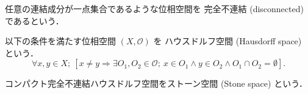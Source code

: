 \documentclass[titlepage]{ltjsreport}
\begin{document}
\begin{definition}[完全不連結]
  任意の連結成分が一点集合であるような位相空間を
  完全不連結 (disconnected) であるという．
\end{definition}

\begin{definition}[ハウスドルフ空間]
  以下の条件を満たす位相空間 $(X,\mathcal{O})$ を
  ハウスドルフ空間 (Hausdorff space) という．
  \begin{equation}
    \forall x,y\in X;
    \ \left[x\neq y\Longrightarrow\exists O_1,O_2\in\mathcal{O};
      \ x\in O_1\wedge y\in O_2\wedge O_1\cap O_2=\emptyset\right].
  \end{equation}
\end{definition}

\begin{definition}[ストーン空間]\label{def:stone-space}
  コンパクト完全不連結ハウスドルフ空間をストーン空間 (Stone space) という．
\end{definition}
\end{document}
